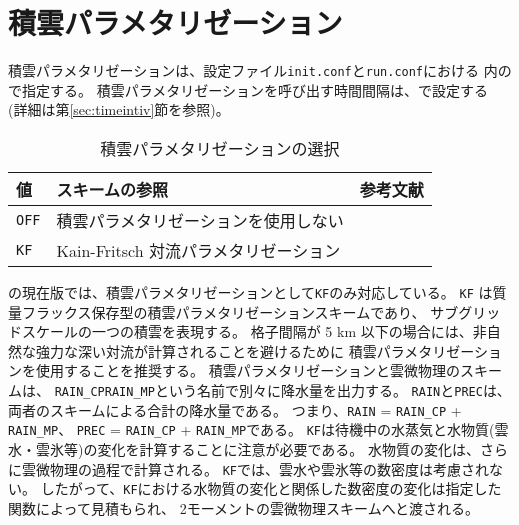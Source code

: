 \section{積雲パラメタリゼーション} \label{sec:basic_usel_cumulus}

積雲パラメタリゼーションは、設定ファイル\verb|init.conf|と\verb|run.conf|における
内ので指定する。
積雲パラメタリゼーションを呼び出す時間間隔は、で設定する
(詳細は第\ref{sec:timeintiv}節を参照)。

\begin{table}[h]
\begin{center}
  \caption{積雲パラメタリゼーションの選択}
  \label{tab:nml_atm_cp}
  \begin{tabularx}{150mm}{lXX} \hline
    \rowcolor[gray]{0.9}  値 & スキームの参照 & 参考文献 \\ \hline
      \verb|OFF|  & 積雲パラメタリゼーションを使用しない &  \\
      \verb|KF|   & Kain-Fritsch 対流パラメタリゼーション & \citet{kain_1990,kain_2004} \\
    \hline
  \end{tabularx}
\end{center}
\end{table}

\scalerm の現在版では、積雲パラメタリゼーションとして\verb|KF|のみ対応している。
\verb|KF| は質量フラックス保存型の積雲パラメタリゼーションスキームであり、
サブグリッドスケールの一つの積雲を表現する。
格子間隔が 5 km 以下の場合には、非自然な強力な深い対流が計算されることを避けるために
積雲パラメタリゼーションを使用することを推奨する。
積雲パラメタリゼーションと雲微物理のスキームは、
\verb|RAIN_CP|\verb|RAIN_MP|という名前で別々に降水量を出力する。
\verb|RAIN|と\verb|PREC|は、両者のスキームによる合計の降水量である。
つまり、\verb|RAIN| = \verb|RAIN_CP| + \verb|RAIN_MP|、
\verb|PREC| = \verb|RAIN_CP| + \verb|RAIN_MP|である。
\verb|KF|は待機中の水蒸気と水物質(雲水・雲氷等)の変化を計算することに注意が必要である。
水物質の変化は、さらに雲微物理の過程で計算される。
\verb|KF|では、雲水や雲氷等の数密度は考慮されない。
したがって、\verb|KF|における水物質の変化と関係した数密度の変化は指定した関数によって見積もられ、
2モーメントの雲微物理スキームへと渡される。

